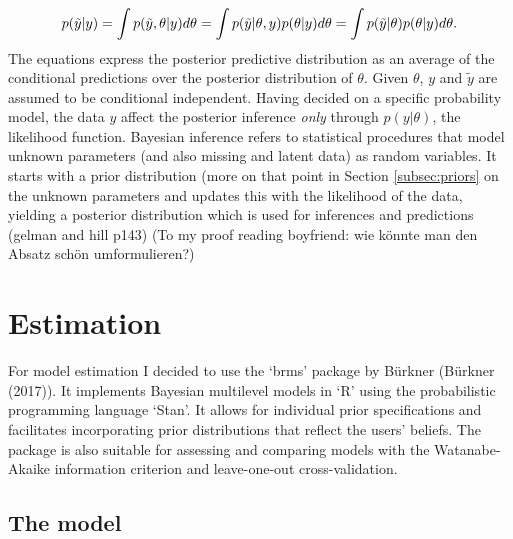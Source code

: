 \documentclass[a4, 12pt]{article}
\begin{document}
\[p(\tilde{y}|y)=\int p(\tilde{y},\theta|y)d\theta \\
= \int p(\tilde{y}|\theta,y)p(\theta|y)d\theta \\
= \int p(\tilde{y}|\theta)p(\theta|y)d\theta.\]
The equations express the posterior predictive distribution as an average of the conditional predictions over the posterior distribution of \(\theta\). Given \(\theta\), \(y\) and \(\tilde{y}\) are assumed to be conditional independent.
Having decided on a specific probability model, the data \(y\) affect the posterior inference \emph{only} through \(p(y|\theta)\), the likelihood function.
Bayesian inference refers to statistical procedures that model unknown parameters (and also missing and latent data) as random variables. It starts with a prior distribution (more on that point in Section \ref{subsec:priors} on the unknown parameters and updates this with the likelihood of the data, yielding a posterior distribution which is used for inferences and predictions (gelman and hill p143) (To my proof reading boyfriend: wie könnte man den Absatz schön umformulieren?)

\clearpage

\hypertarget{estimation}{%
\section{Estimation}\label{estimation}}

\label{sec:estimation}
For model estimation I decided to use the `brms' package by Bürkner (Bürkner (2017)). It implements Bayesian multilevel models in `R' using the probabilistic programming language `Stan'. It allows for individual prior specifications and facilitates incorporating prior distributions that reflect the users' beliefs. The package is also suitable for assessing and comparing models with the Watanabe-Akaike information criterion and leave-one-out cross-validation.

\hypertarget{the-model}{%
\subsection{The model}\label{the-model}}
\end{document}
